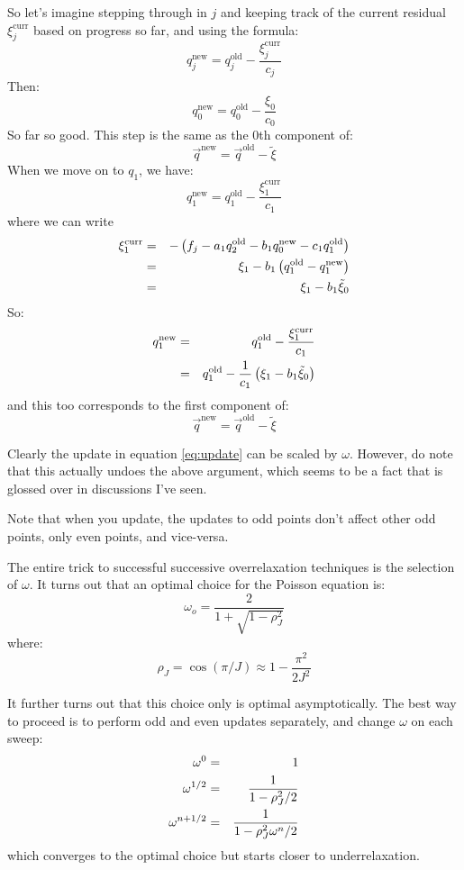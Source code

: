 So let's imagine stepping through in $j$ and keeping track of the
current residual $\xi_j^{\mathrm{curr}}$ based on progress so far, and using the
formula:
\begin{equation}
\label{eq:update}
q_j^{\mathrm{new}} = q_j^{\mathrm{old}}
- \frac{\xi_j^{\mathrm{curr}}}{c_j}
\end{equation}
Then:
\begin{equation}
q_0^{\mathrm{new}} = q_0^{\mathrm{old}} - \frac{\xi_0}{c_0}
\end{equation}
So far so good. This step is the same as the 0th component of:
\begin{equation}
\vec{q}^{\mathrm{new}} = \vec{q}^{\mathrm{old}}
- \tilde\xi
\end{equation}
When we move on to $q_1$, we have:
\begin{equation}
q_1^{\mathrm{new}} = q_1^{\mathrm{old}}
- \frac{\xi_1^{\mathrm{curr}}}{c_1}
\end{equation}
where we can write
\begin{eqnarray}
\xi_1^{\mathrm{curr}} &=& - \left(f_j - a_1 q_2^{\mathrm{old}} - b_1
q_0^{\mathrm{new}} - c_1 q_1^{\mathrm{old}}\right) \cr
&=& \xi_1 - b_1 \left(q_1^{\mathrm{old}} -
q_1^{\mathrm{new}}\right) \cr
&=& \xi_1 - b_1 \tilde\xi_0
\end{eqnarray}
So:
\begin{eqnarray}
q_1^{\mathrm{new}} &=& q_1^{\mathrm{old}}
- \frac{\xi_1^{\mathrm{curr}}}{c_1} \cr
&=& q_1^{\mathrm{old}} - \frac{1}{c_1} \left(\xi_1
- b_1 \tilde\xi_0\right)
\end{eqnarray}
and this too corresponds to the first component of: 
\begin{equation}
\vec{q}^{\mathrm{new}} = \vec{q}^{\mathrm{old}}
- \tilde\xi
\end{equation}

Clearly the update in equation \ref{eq:update} can be scaled by
$\omega$. However, do note that this actually undoes the above
argument, which seems to be a fact that is glossed over in discussions
I've seen.

Note that when you update, the updates to odd points don't affect
other odd points, only even points, and vice-versa. 

The entire trick to successful successive overrelaxation techniques is
the selection of $\omega$. It turns out that an optimal choice for the
Poisson equation is:
\begin{equation}
\omega_{o} = \frac{2}{1+\sqrt{1-\rho_J^2}}
\end{equation}
where:
\begin{equation}
\rho_J = \cos(\pi/J) \approx 1 - \frac{\pi^2}{2J^2}
\end{equation}

It further turns out that this choice only is optimal
asymptotically. The best way to proceed is to perform odd and even
updates separately, and change $\omega$ on each sweep:
\begin{eqnarray}
\omega^{0} &=& 1 \cr
\omega^{1/2} &=& \frac{1}{1-\rho_J^2 /2} \cr
\omega^{n+1/2} &=& \frac{1}{1-\rho_J^2 \omega^n /2} \cr
\end{eqnarray}
which converges to the optimal choice but starts closer to
underrelaxation. 

